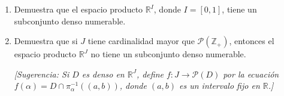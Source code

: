 
\item 
    \begin{enumerate}
        \item Demuestra que el espacio producto $\mathbb{R}^{I}$, donde $I = [0,1]$, tiene un subconjunto denso numerable.
        \item Demuestra que si $J$ tiene cardinalidad mayor que $\mathcal{P}(\mathbb{Z}_{+})$, entonces el espacio producto $\mathbb{R}^{J}$ no tiene un subconjunto denso numerable.  
        
        \textit{[Sugerencia: Si $D$ es denso en $\mathbb{R}^{J}$, define $f: J \to \mathcal{P}(D)$ por la ecuación $f(\alpha) = D \cap \pi_{\alpha}^{-1}((a,b))$, donde $(a,b)$ es un intervalo fijo en $\mathbb{R}$.]}
    \end{enumerate}

  